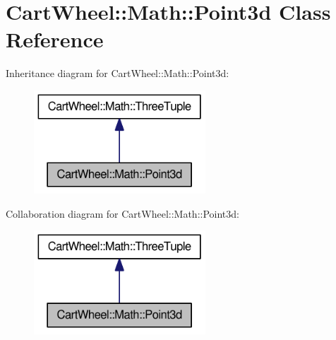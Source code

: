 \hypertarget{classCartWheel_1_1Math_1_1Point3d}{
\section{CartWheel::Math::Point3d Class Reference}
\label{classCartWheel_1_1Math_1_1Point3d}
}


Inheritance diagram for CartWheel::Math::Point3d:\nopagebreak
\begin{figure}[H]
\begin{center}
\leavevmode
\includegraphics[width=182pt]{classCartWheel_1_1Math_1_1Point3d__inherit__graph}
\end{center}
\end{figure}


Collaboration diagram for CartWheel::Math::Point3d:\nopagebreak
\begin{figure}[H]
\begin{center}
\leavevmode
\includegraphics[width=182pt]{classCartWheel_1_1Math_1_1Point3d__coll__graph}
\end{center}
\end{figure}
